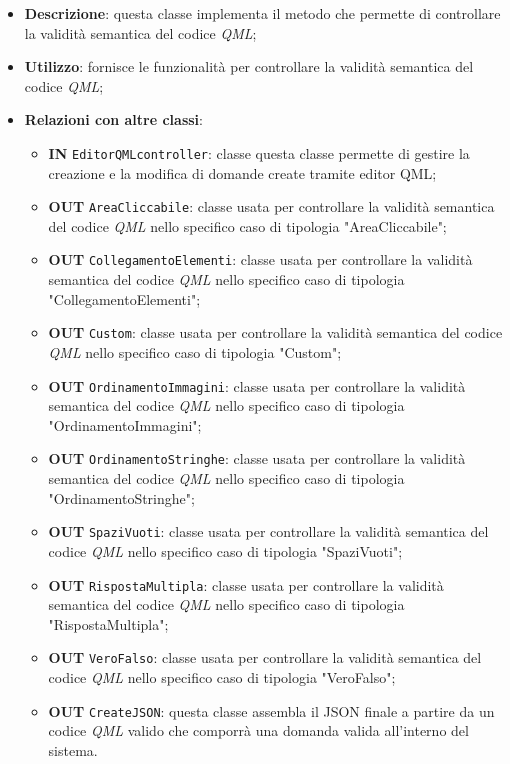 \begin{itemize}
	\item \textbf{Descrizione}: questa classe implementa il metodo che permette di controllare la validità semantica del codice \textit{QML};
	\item \textbf{Utilizzo}: fornisce le funzionalità per controllare la validità semantica del codice \textit{QML};
	\item \textbf{Relazioni con altre classi}:
	\begin{itemize}
		\item \textbf{IN} \texttt{EditorQMLcontroller}: classe questa classe permette di gestire la creazione e la modifica di domande create tramite editor QML;		
		\item \textbf{OUT} \texttt{AreaCliccabile}: classe usata per controllare la validità semantica del codice \textit{QML} nello specifico caso di tipologia "AreaCliccabile";
		\item \textbf{OUT} \texttt{CollegamentoElementi}: classe usata per controllare la validità semantica del codice \textit{QML} nello specifico caso di tipologia "CollegamentoElementi";
		\item \textbf{OUT} \texttt{Custom}: classe usata per controllare la validità semantica del codice \textit{QML} nello specifico caso di tipologia "Custom";
		\item \textbf{OUT} \texttt{OrdinamentoImmagini}: classe usata per controllare la validità semantica del codice \textit{QML} nello specifico caso di tipologia "OrdinamentoImmagini";
		\item \textbf{OUT} \texttt{OrdinamentoStringhe}: classe usata per controllare la validità semantica del codice \textit{QML} nello specifico caso di tipologia "OrdinamentoStringhe";
		\item \textbf{OUT} \texttt{SpaziVuoti}: classe usata per controllare la validità semantica del codice \textit{QML} nello specifico caso di tipologia "SpaziVuoti";
		\item \textbf{OUT} \texttt{RispostaMultipla}: classe usata per controllare la validità semantica del codice \textit{QML} nello specifico caso di tipologia "RispostaMultipla";
		\item \textbf{OUT} \texttt{VeroFalso}: classe usata per controllare la validità semantica del codice \textit{QML} nello specifico caso di tipologia "VeroFalso";
		\item \textbf{OUT} \texttt{CreateJSON}: questa classe assembla il JSON finale a partire da un codice \textit{QML} valido che comporrà una domanda valida all'interno del sistema.

\end{itemize}
\end{itemize}
